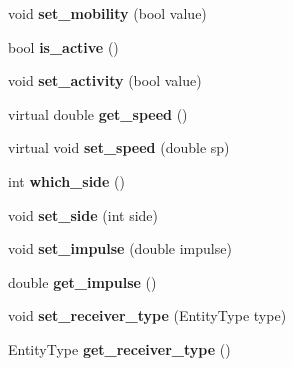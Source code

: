\begin{DoxyCompactItemize}
\item 
void {\bfseries set\+\_\+mobility} (bool value)\hypertarget{classSensor_ac99e7911f9bafc6268838c7c442ae35b}{}\label{classSensor_ac99e7911f9bafc6268838c7c442ae35b}

\item 
bool {\bfseries is\+\_\+active} ()\hypertarget{classSensor_acc1bddd754c5a344d659339ad9ca29c8}{}\label{classSensor_acc1bddd754c5a344d659339ad9ca29c8}

\item 
void {\bfseries set\+\_\+activity} (bool value)\hypertarget{classSensor_a0423f1c97ee6117b6f7ea2f904187b67}{}\label{classSensor_a0423f1c97ee6117b6f7ea2f904187b67}

\item 
virtual double {\bfseries get\+\_\+speed} ()\hypertarget{classSensor_acd39d4b288071f00af00dc7b91c23535}{}\label{classSensor_acd39d4b288071f00af00dc7b91c23535}

\item 
virtual void {\bfseries set\+\_\+speed} (double sp)\hypertarget{classSensor_adc40f680bc255619f4e966aefc0337c0}{}\label{classSensor_adc40f680bc255619f4e966aefc0337c0}

\item 
int {\bfseries which\+\_\+side} ()\hypertarget{classSensor_aa7c8b3c67f2ecf38f290e43eb82928be}{}\label{classSensor_aa7c8b3c67f2ecf38f290e43eb82928be}

\item 
void {\bfseries set\+\_\+side} (int side)\hypertarget{classSensor_a3059a194b225f0aa44b67c2a57c00c47}{}\label{classSensor_a3059a194b225f0aa44b67c2a57c00c47}

\item 
void {\bfseries set\+\_\+impulse} (double impulse)\hypertarget{classSensor_a04df3ce884e6c9b0e4f322c2ae48c0cf}{}\label{classSensor_a04df3ce884e6c9b0e4f322c2ae48c0cf}

\item 
double {\bfseries get\+\_\+impulse} ()\hypertarget{classSensor_aec7fb6b13d6642f6ca8dc8028c9ba39b}{}\label{classSensor_aec7fb6b13d6642f6ca8dc8028c9ba39b}

\item 
void {\bfseries set\+\_\+receiver\+\_\+type} (Entity\+Type type)\hypertarget{classSensor_a3b3e712ea3856d16bfe194ef4ea55793}{}\label{classSensor_a3b3e712ea3856d16bfe194ef4ea55793}

\item 
Entity\+Type {\bfseries get\+\_\+receiver\+\_\+type} ()\hypertarget{classSensor_a878345d739f859d551dafb1148ebcd4a}{}\label{classSensor_a878345d739f859d551dafb1148ebcd4a}

\end{DoxyCompactItemize}


